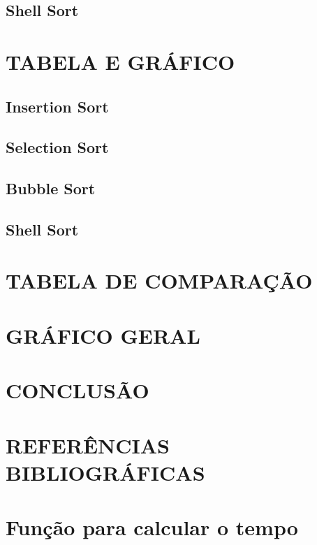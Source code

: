 \documentclass[12pt,arial]{article}
\begin{document}
		\subsection{Shell Sort}
		
	    \newpage

		\section{TABELA E GRÁFICO}
            \subsection{Insertion Sort}
		
		\newpage

		\subsection{Selection Sort}
		
		\newpage

		\subsection{Bubble Sort}
		
		\newpage

		\subsection{Shell Sort}
		
		\newpage

		\section{TABELA DE COMPARAÇÃO}
		
		\newpage

		\section{GRÁFICO GERAL}
		
		\newpage

		\section{CONCLUSÃO}
		
		\newpage

		\section{REFERÊNCIAS BIBLIOGRÁFICAS}
		

		\section{Função para calcular o tempo}
		
\end{document}
